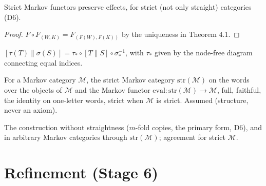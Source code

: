 \begin{proposition}[Proposition 5.6]
\label{prop:5.6}
\leanok
{}
Strict Markov functors preserve effects, for strict (not only straight) categories (D6).
\end{proposition}
\begin{proof}
\leanok
$F \circ F_{(W,K)} = F_{(F(W), F(K))}$ by the uniqueness in Theorem 4.1.
\end{proof}

\begin{definition}[Twists]
\label{def:5.twists}
\leanok
{}
$[\tau(T) \| \sigma(S)] = \tau_* \circ [T \| S] \circ \sigma_*^{-1}$, with $\tau_*$ given by the
node-free diagram connecting equal indices.
\end{definition}

\begin{definition}
\label{cite:C2}
\leanok
{}
For a Markov category $\mathcal M$, the strict Markov category
$\mathrm{str}(\mathcal M)$ on the words over the objects of $\mathcal M$ and the Markov functor
$\mathrm{eval} : \mathrm{str}(\mathcal M) \to \mathcal M$, full, faithful, the identity on
one-letter words, strict when $\mathcal M$ is strict. Assumed (structure, never an axiom).
\end{definition}

\begin{remark}
\label{rem:5.7}
\leanok
{}
The construction without straightness ($m$-fold copies, the primary form, D6), and in
arbitrary Markov categories through $\mathrm{str}(\mathcal M)$; agreement for strict
$\mathcal M$.
\end{remark}

\section{Refinement (Stage 6)}


